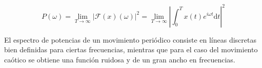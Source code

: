 	\begin{equation}
		P(\omega) = \lim_{T\rightarrow\infty} |\mathcal{F}(x) (\omega)|^2 = \lim_{T\rightarrow\infty} \left|\int_{0}^{T} x(t) e^{i\omega t} \mathrm{d}t \right| ^2
		\label{eq:DEP}
	\end{equation}

El espectro de potencias de un movimiento peri\'odico consiste en l\'ineas discretas bien definidas para ciertas frecuencias, mientras que para el caso del movimiento ca\'otico se obtiene una funci\'on ruidosa y de un gran ancho en frecuencias.
